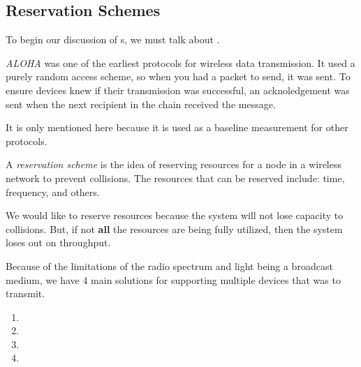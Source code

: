 \subsection{Reservation Schemes}\label{subsec:Reservation_Scheme}
To begin our discussion of s, we must talk about .

\begin{definition}[ALOHA]\label{def:ALOHA}
  \emph{ALOHA} was one of the earliest protocols for wireless data transmission.
  It used a purely random access scheme, so when you had a packet to send, it was sent.
  To ensure devices knew if their transmission was successful, an acknoledgement was sent when the next recipient in the chain received the message.

  \begin{remark}
    It is only mentioned here because it is used as a baseline measurement for other protocols.
  \end{remark}
\end{definition}

\begin{definition}\label{def:Reservation_Scheme}
  A \emph{reservation scheme} is the idea of reserving resources for a node in a wireless network to prevent collisions.
  The resources that can be reserved include: time, frequency, and others.

  We would like to reserve resources because the system will not lose capacity to collisions.
  But, if not \textbf{all} the resources are being fully utilized, then the system loses out on throughput.

  Because of the limitations of the radio spectrum and light being a broadcast medium, we have 4 main solutions for supporting multiple devices that was to transmit.
  \begin{enumerate}[noitemsep]
  \item {}
  \item {}
  \item {}
  \item {}
  \end{enumerate}
\end{definition}


